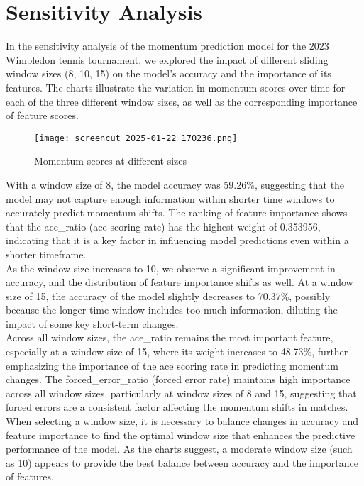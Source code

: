 \documentclass{mcmthesis}
\begin{document}
\section{Sensitivity Analysis}
In the sensitivity analysis of the momentum prediction model for the 2023 Wimbledon tennis
tournament, we explored the impact of different sliding window sizes (8, 10, 15) on the model's
accuracy and the importance of its features. The charts illustrate the variation in momentum scores
over time for each of the three different window sizes, as well as the corresponding importance of
feature scores.

\begin{figure}[htbp]
    \centering
    \texttt{[image: screencut 2025-01-22 170236.png]}
    \caption{Momentum scores at different sizes} \label{Figure 25}
\end{figure}
















With a window size of 8, the model accuracy was 59.26\%, suggesting that the model may not
capture enough information within shorter time windows to accurately predict momentum shifts. The ranking of feature importance shows that the ace\_ratio (ace scoring rate) has the highest
weight of 0.353956, indicating that it is a key factor in influencing model predictions even within
a shorter timeframe.\\
As the window size increases to 10, we observe a significant improvement in accuracy, and
the distribution of feature importance shifts as well. At a window size of 15, the accuracy of the
model slightly decreases to 70.37\%, possibly because the longer time window includes too much
information, diluting the impact of some key short-term changes.\\
Across all window sizes, the ace\_ratio remains the most important feature, especially at a
window size of 15, where its weight increases to 48.73\%, further emphasizing the importance of
the ace scoring rate in predicting momentum changes. The forced\_error\_ratio (forced error rate)
maintains high importance across all window sizes, particularly at window sizes of 8 and 15, suggesting that forced errors are a consistent factor affecting the momentum shifts in matches.\\
When selecting a window size, it is necessary to balance changes in accuracy and feature
importance to find the optimal window size that enhances the predictive performance of the model. As the charts suggest, a moderate window size (such as 10) appears to provide the best balance
between accuracy and the importance of features.\\
\end{document}
